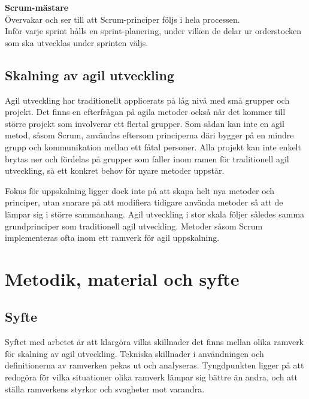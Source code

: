 		\textbf{Scrum-mästare} \\
		Övervakar och ser till att Scrum-principer följs i hela processen. \\
		
		Inför varje sprint hålls en sprint-planering, under vilken de delar ur orderstocken som ska utvecklas under sprinten väljs.
			
		\cite{scrum_guide}
		

	\subsection{Skalning av agil utveckling}
		
		Agil utveckling har traditionellt applicerats på låg nivå med små grupper och projekt. Det finns en efterfrågan på agila metoder också när det kommer till större projekt som involverar ett flertal grupper. Som sådan kan inte en agil metod, såsom Scrum, användas eftersom principerna däri bygger på en mindre grupp och kommunikation mellan ett fåtal personer.
		Alla projekt kan inte enkelt brytas ner och fördelas på grupper som faller inom ramen för traditionell agil utveckling, så ett konkret behov för nyare metoder uppstår.
		
		Fokus för uppskalning ligger dock inte på att skapa helt nya metoder och principer, utan snarare på att modifiera tidigare använda metoder så att de lämpar sig i större sammanhang. Agil utveckling i stor skala följer således samma grundprinciper som traditionell agil utveckling. Metoder såsom Scrum implementeras ofta inom ett ramverk för agil uppskalning.

		
	\newpage

\section{Metodik, material och syfte}
	
	
	\subsection{Syfte}
	
		Syftet med arbetet är att klargöra vilka skillnader det finns mellan olika ramverk för skalning av agil utveckling. Tekniska skillnader i användningen och definitionerna av ramverken pekas ut och analyseras.
		Tyngdpunkten ligger på att redogöra för vilka situationer olika ramverk lämpar sig bättre än andra, och att ställa ramverkens styrkor och svagheter mot varandra. \newline
		
